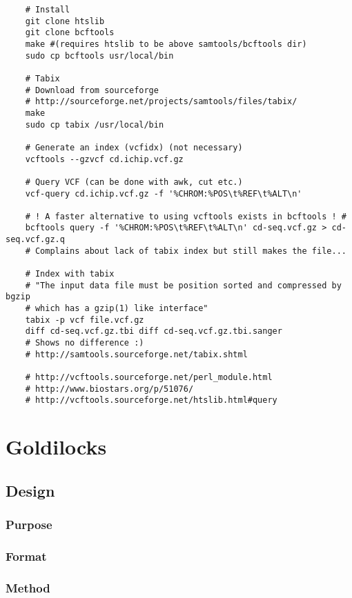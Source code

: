 \begin{verbatim}
    # Install
    git clone htslib
    git clone bcftools
    make #(requires htslib to be above samtools/bcftools dir)
    sudo cp bcftools usr/local/bin

    # Tabix
    # Download from sourceforge
    # http://sourceforge.net/projects/samtools/files/tabix/
    make
    sudo cp tabix /usr/local/bin

    # Generate an index (vcfidx) (not necessary)
    vcftools --gzvcf cd.ichip.vcf.gz

    # Query VCF (can be done with awk, cut etc.)
    vcf-query cd.ichip.vcf.gz -f '%CHROM:%POS\t%REF\t%ALT\n'

    # ! A faster alternative to using vcftools exists in bcftools ! #
    bcftools query -f '%CHROM:%POS\t%REF\t%ALT\n' cd-seq.vcf.gz > cd-seq.vcf.gz.q
    # Complains about lack of tabix index but still makes the file...

    # Index with tabix
    # "The input data file must be position sorted and compressed by bgzip 
    # which has a gzip(1) like interface"
    tabix -p vcf file.vcf.gz
    diff cd-seq.vcf.gz.tbi diff cd-seq.vcf.gz.tbi.sanger
    # Shows no difference :)
    # http://samtools.sourceforge.net/tabix.shtml

    # http://vcftools.sourceforge.net/perl_module.html
    # http://www.biostars.org/p/51076/
    # http://vcftools.sourceforge.net/htslib.html#query
\end{verbatim}


\chapter{Goldilocks}

\section{Design}
\subsection{Purpose}
\subsection{Format}
\subsection{Method}


